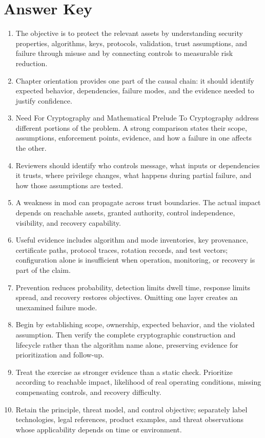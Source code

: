 \documentclass[11pt]{article}
\begin{document}
\section*{Answer Key}
\begin{enumerate}
\item The objective is to protect the relevant assets by understanding security properties, algorithms, keys, protocols, validation, trust assumptions, and failure through misuse and by connecting controls to measurable risk reduction.
\item Chapter orientation provides one part of the causal chain: it should identify expected behavior, dependencies, failure modes, and the evidence needed to justify confidence.
\item Need For Cryptography and Mathematical Prelude To Cryptography address different portions of the problem. A strong comparison states their scope, assumptions, enforcement points, evidence, and how a failure in one affects the other.
\item Reviewers should identify who controls message, what inputs or dependencies it trusts, where privilege changes, what happens during partial failure, and how those assumptions are tested.
\item A weakness in mod can propagate across trust boundaries. The actual impact depends on reachable assets, granted authority, control independence, visibility, and recovery capability.
\item Useful evidence includes algorithm and mode inventories, key provenance, certificate paths, protocol traces, rotation records, and test vectors; configuration alone is insufficient when operation, monitoring, or recovery is part of the claim.
\item Prevention reduces probability, detection limits dwell time, response limits spread, and recovery restores objectives. Omitting one layer creates an unexamined failure mode.
\item Begin by establishing scope, ownership, expected behavior, and the violated assumption. Then verify the complete cryptographic construction and lifecycle rather than the algorithm name alone, preserving evidence for prioritization and follow-up.
\item Treat the exercise as stronger evidence than a static check. Prioritize according to reachable impact, likelihood of real operating conditions, missing compensating controls, and recovery difficulty.
\item Retain the principle, threat model, and control objective; separately label technologies, legal references, product examples, and threat observations whose applicability depends on time or environment.
\end{enumerate}
\end{document}
